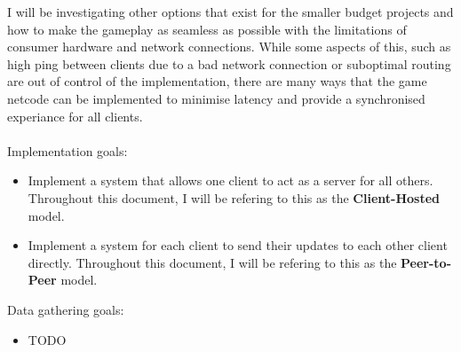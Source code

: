I will be investigating other options that exist for the smaller budget projects and how to make the gameplay as seamless as possible with the limitations of consumer hardware and network connections. While some aspects of this, such as high ping between clients due to a bad network connection or suboptimal routing are out of control of the implementation, there are many ways that the game netcode can be implemented to minimise latency and provide a synchronised experiance for all clients.
\\
\\
Implementation goals:
\begin{itemize}
\item Implement a system that allows one client to act as a server for all others. Throughout this document, I will be refering to this as the \textbf{Client-Hosted} model.
\item Implement a system for each client to send their updates to each other client directly. Throughout this document, I will be refering to this as the \textbf{Peer-to-Peer} model.
\end{itemize}
Data gathering goals:
\begin{itemize}
\item TODO
\end{itemize}

\newpage

